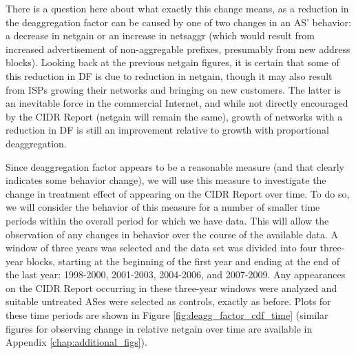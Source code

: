 There is a question here about what exactly this change means, as a reduction
in the deaggregation factor can be caused by one of two changes in an AS'
behavior: a decrease in netgain or an increase in netsaggr (which would result
from increased advertisement of non-aggregable prefixes, presumably from new
address blocks). Looking back at the previous netgain figures, it is certain
that some of this reduction in DF is due to reduction in netgain, though it may
also result from ISPs growing their networks and bringing on new customers. The
latter is an inevitable force in the commercial Internet, and while not
directly encouraged by the CIDR Report (netgain will remain the same), growth
of networks with a reduction in DF is still an improvement relative to growth
with proportional deaggregation.


Since deaggregation factor appears to be a reasonable measure (and that clearly
indicates some behavior change), we will use this measure to investigate the
change in treatment effect of appearing on the CIDR Report over time. To do so,
we will consider the behavior of this measure for a number of smaller time
periods within the overall period for which we have data. This will allow
the observation of any changes in behavior over the course of the available
data. A window of three years was selected and the data set was divided into
four three-year blocks, starting at the beginning of the first year and ending
at the end of the last year: 1998-2000, 2001-2003, 2004-2006, and 2007-2009.
Any appearances on the CIDR Report occurring in these three-year windows were
analyzed and suitable untreated ASes were selected as controls, exactly as
before. Plots for these time periods are shown in Figure
\ref{fig:deagg_factor_cdf_time} (similar figures for observing change in
relative netgain over time are available in Appendix
\ref{chap:additional_figs}).


